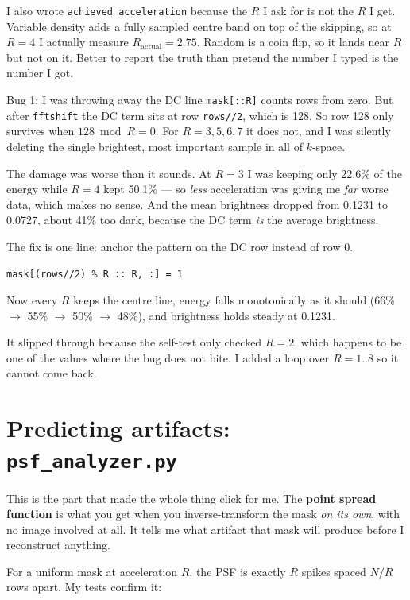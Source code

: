 \documentclass[11pt,a4paper]{article}
\begin{document}
I also wrote \texttt{achieved\_acceleration} because the $R$ I ask for is not the
$R$ I get. Variable density adds a fully sampled centre band on top of the
skipping, so at $R=4$ I actually measure $R_{\text{actual}}=2.75$. Random is a
coin flip, so it lands near $R$ but not on it. Better to report the truth than
pretend the number I typed is the number I got.

\begin{bugbox}{Bug 1: I was throwing away the DC line}
\texttt{mask[::R]} counts rows from zero. But after \texttt{fftshift} the DC term
sits at row \texttt{rows//2}, which is 128. So row 128 only survives when
$128 \bmod R = 0$. For $R=3,5,6,7$ it does not, and I was silently deleting the
single brightest, most important sample in all of $k$-space.

The damage was worse than it sounds. At $R=3$ I was keeping only 22.6\% of the
energy while $R=4$ kept 50.1\% --- so \emph{less} acceleration was giving me
\emph{far} worse data, which makes no sense. And the mean brightness dropped from
0.1231 to 0.0727, about 41\% too dark, because the DC term \emph{is} the average
brightness.

The fix is one line: anchor the pattern on the DC row instead of row 0.
\begin{lstlisting}
mask[(rows//2) % R :: R, :] = 1
\end{lstlisting}
Now every $R$ keeps the centre line, energy falls monotonically as it should
(66\% $\to$ 55\% $\to$ 50\% $\to$ 48\%), and brightness holds steady at 0.1231.

It slipped through because the self-test only checked $R=2$, which happens to be
one of the values where the bug does not bite. I added a loop over $R=1..8$ so it
cannot come back.
\end{bugbox}

\section{Predicting artifacts: \texttt{psf\_analyzer.py}}

This is the part that made the whole thing click for me. The \textbf{point spread
function} is what you get when you inverse-transform the mask \emph{on its own},
with no image involved at all. It tells me what artifact that mask will produce
before I reconstruct anything.

For a uniform mask at acceleration $R$, the PSF is exactly $R$ spikes spaced
$N/R$ rows apart. My tests confirm it:
\end{document}
